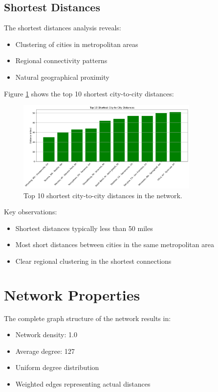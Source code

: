 \subsection{Shortest Distances}
The shortest distances analysis reveals:
\begin{itemize}
    \item Clustering of cities in metropolitan areas
    \item Regional connectivity patterns
    \item Natural geographical proximity
\end{itemize}

Figure \ref{fig:shortest_dist} shows the top 10 shortest city-to-city distances:

\begin{figure}[H]
    \centering
    \includegraphics[width=0.8\textwidth]{figures/shortest_distances.png}
    \caption{Top 10 shortest city-to-city distances in the network.}
    \label{fig:shortest_dist}
\end{figure}

Key observations:
\begin{itemize}
    \item Shortest distances typically less than 50 miles
    \item Most short distances between cities in the same metropolitan area
    \item Clear regional clustering in the shortest connections
\end{itemize}

\section{Network Properties}
The complete graph structure of the network results in:
\begin{itemize}
    \item Network density: 1.0
    \item Average degree: 127
    \item Uniform degree distribution
    \item Weighted edges representing actual distances
\end{itemize}

